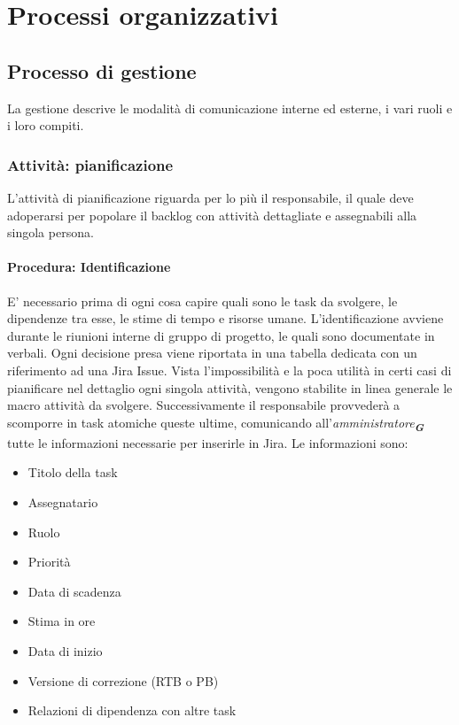 \documentclass[a4paper,12pt]{article}
\newcommand{\glossario}[1]{\textit{#1}\textsubscript{\textbf{\textit{\textcolor{lightblack}{G}}}}}
\begin{document}
\section{Processi organizzativi}
\subsection{Processo di gestione} \label{gestione_processi_organizzativi}
La gestione descrive le modalità di comunicazione interne ed esterne, i vari
ruoli e i loro compiti.

\subsubsection{Attività: pianificazione}
L'attività di pianificazione riguarda per lo più il responsabile, il quale deve
adoperarsi per popolare il backlog con attività dettagliate e assegnabili alla
singola persona.
\paragraph{Procedura: Identificazione}\label{identificazioneTaskGestione}
E' necessario prima di ogni cosa capire quali sono le task da svolgere, le
dipendenze tra esse, le stime di tempo e risorse umane. L'identificazione
avviene durante le riunioni interne di gruppo di progetto, le quali sono
documentate in verbali. Ogni decisione presa viene riportata in una tabella
dedicata con un riferimento ad una Jira Issue. Vista l'impossibilità e la poca
utilità in certi casi di pianificare nel dettaglio ogni singola attività, vengono stabilite in
linea generale le macro attività da svolgere. Successivamente il responsabile
provvederà a scomporre in task atomiche queste ultime, comunicando
all'\glossario{amministratore} tutte le informazioni necessarie per inserirle in Jira. Le
informazioni sono:
\begin{itemize}
    \item Titolo della task
    \item Assegnatario
    \item Ruolo
    \item Priorità
    \item Data di scadenza
    \item Stima in ore
    \item Data di inizio
    \item Versione di correzione (RTB o PB)
    \item Relazioni di dipendenza con altre task
\end{itemize}
\end{document}
